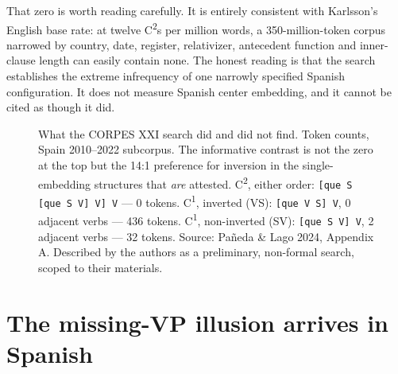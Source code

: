 \documentclass[11pt, a4paper]{article}
\begin{document}
That zero is worth reading carefully. It is entirely consistent with Karlsson's English base rate: at twelve C\textsuperscript{2}s per million words, a 350-million-token corpus narrowed by country, date, register, relativizer, antecedent function and inner-clause length can easily contain none. The honest reading is that the search establishes the extreme infrequency of one narrowly specified Spanish configuration. It does not measure Spanish center embedding, and it cannot be cited as though it did.

\begin{figure}[htb]
\centering
{}
\caption{What the CORPES XXI search did and did not find. Token counts, Spain 2010--2022 subcorpus. The informative contrast is not the zero at the top but the 14:1 preference for inversion in the single-embedding structures that \emph{are} attested. C\textsuperscript{2}, either order: \texttt{[que S [que S V] V] V} --- 0 tokens. C\textsuperscript{1}, inverted (VS): \texttt{[que V S] V}, 0 adjacent verbs --- 436 tokens. C\textsuperscript{1}, non-inverted (SV): \texttt{[que S V] V}, 2 adjacent verbs --- 32 tokens. Source: Pañeda \& Lago 2024, Appendix A. Described by the authors as a preliminary, non-formal search, scoped to their materials.}
\end{figure}

\section{The missing-VP illusion arrives in Spanish}
\end{document}
